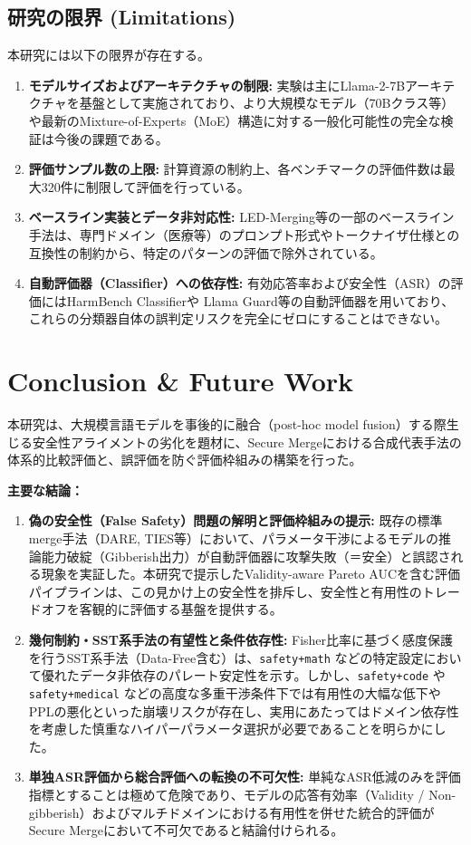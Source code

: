 \documentclass{article}
\begin{document}
\subsection{研究の限界 (Limitations)}
本研究には以下の限界が存在する。
\begin{enumerate}
    \item \textbf{モデルサイズおよびアーキテクチャの制限:} 実験は主にLlama-2-7Bアーキテクチャを基盤として実施されており、より大規模なモデル（70Bクラス等）や最新のMixture-of-Experts（MoE）構造に対する一般化可能性の完全な検証は今後の課題である。
    \item \textbf{評価サンプル数の上限:} 計算資源の制約上、各ベンチマークの評価件数は最大320件に制限して評価を行っている。
    \item \textbf{ベースライン実装とデータ非対応性:} LED-Merging等の一部のベースライン手法は、専門ドメイン（医療等）のプロンプト形式やトークナイザ仕様との互換性の制約から、特定のパターンの評価で除外されている。
    \item \textbf{自動評価器（Classifier）への依存性:} 有効応答率および安全性（ASR）の評価にはHarmBench Classifierや Llama Guard等の自動評価器を用いており、これらの分類器自体の誤判定リスクを完全にゼロにすることはできない。
\end{enumerate}

\section{Conclusion \& Future Work}

本研究は、大規模言語モデルを事後的に融合（post-hoc model fusion）する際生じる安全性アライメントの劣化を題材に、Secure Mergeにおける合成代表手法の体系的比較評価と、誤評価を防ぐ評価枠組みの構築を行った。

\textbf{主要な結論：}
\begin{enumerate}
    \item \textbf{偽の安全性（False Safety）問題の解明と評価枠組みの提示:} 既存の標準merge手法（DARE, TIES等）において、パラメータ干渉によるモデルの推論能力破綻（Gibberish出力）が自動評価器に攻撃失敗（＝安全）と誤認される現象を実証した。本研究で提示したValidity-aware Pareto AUCを含む評価パイプラインは、この見かけ上の安全性を排斥し、安全性と有用性のトレードオフを客観的に評価する基盤を提供する。
    \item \textbf{幾何制約・SST系手法の有望性と条件依存性:} Fisher比率に基づく感度保護を行うSST系手法（Data-Free含む）は、\texttt{safety+math} などの特定設定において優れたデータ非依存のパレート安定性を示す。しかし、\texttt{safety+code} や \texttt{safety+medical} などの高度な多重干渉条件下では有用性の大幅な低下やPPLの悪化といった崩壊リスクが存在し、実用にあたってはドメイン依存性を考慮した慎重なハイパーパラメータ選択が必要であることを明らかにした。
    \item \textbf{単独ASR評価から総合評価への転換の不可欠性:} 単純なASR低減のみを評価指標とすることは極めて危険であり、モデルの応答有効率（Validity / Non-gibberish）およびマルチドメインにおける有用性を併せた統合的評価がSecure Mergeにおいて不可欠であると結論付けられる。
\end{enumerate}
\end{document}
